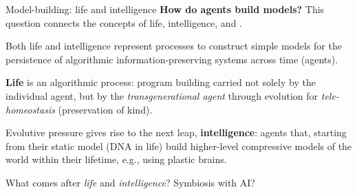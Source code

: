 \begin{frame}[label=ladila]{Model-building: life and intelligence}
 \textbf{How do agents build models?} This question connects the concepts of life, intelligence, and \SEP. \vfill
 
 Both life and intelligence represent processes to construct simple models for the persistence of algorithmic information-preserving systems across time (agents). \vfill
 
  {\textbf{Life}} is an algorithmic process: program building carried not solely by the individual agent, but by the \textit{transgenerational agent} through evolution for {\em tele-homeostasis} (preservation of kind)\cite{Walker2013, Chaitin2012-wd}. \vfill

   Evolutive pressure gives rise to the next leap, {\textbf{intelligence}}: agents that, starting from their static model (DNA in life)   build higher-level compressive models of the world within their lifetime, e.g., using plastic brains.\vfill

   What comes after \textit{life} and \textit{intelligence}? Symbiosis with AI?
  
\end{frame}

 